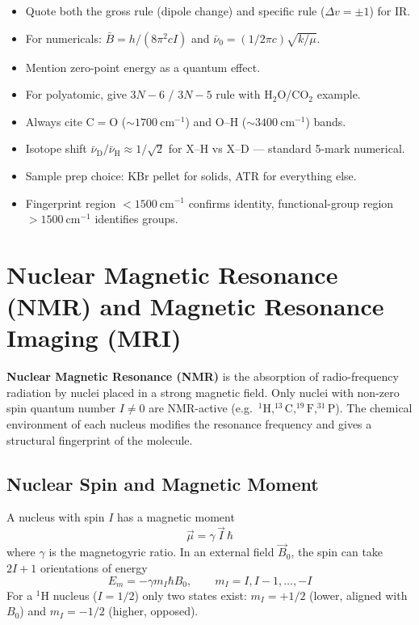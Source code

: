 \documentclass[12pt,a4paper]{article}
\begin{document}
\begin{tcolorbox}[exambox, title={Exam Points (Section 4)}]
\begin{itemize}[leftmargin=*, itemsep=2pt, topsep=2pt]
  \item Quote both the gross rule (dipole change) and specific rule ($\Delta v=\pm1$) for IR.
  \item For numericals: $\bar{B}=h/(8\pi^{2}cI)$ and $\bar{\nu}_0=(1/2\pi c)\sqrt{k/\mu}$.
  \item Mention zero-point energy as a quantum effect.
  \item For polyatomic, give $3N-6$ / $3N-5$ rule with $\mathrm{H_2O}$/$\mathrm{CO_2}$ example.
  \item Always cite C${=}$O ($\sim 1700\ \mathrm{cm^{-1}}$) and O--H ($\sim 3400\ \mathrm{cm^{-1}}$) bands.
  \item Isotope shift $\bar{\nu}_{\mathrm{D}}/\bar{\nu}_{\mathrm{H}} \approx 1/\sqrt{2}$ for X--H vs X--D — standard 5-mark numerical.
  \item Sample prep choice: KBr pellet for solids, ATR for everything else.
  \item Fingerprint region $<1500\ \mathrm{cm^{-1}}$ confirms identity, functional-group region $>1500\ \mathrm{cm^{-1}}$ identifies groups.
\end{itemize}
\end{tcolorbox}

\section{Nuclear Magnetic Resonance (NMR) and Magnetic Resonance Imaging (MRI)}

\begin{tcolorbox}[defbox]
\textbf{Nuclear Magnetic Resonance (NMR)} is the absorption of radio-frequency radiation by nuclei placed in a strong magnetic field. Only nuclei with non-zero spin quantum number $I\neq 0$ are NMR-active (e.g.\ $^{1}\mathrm{H}, ^{13}\mathrm{C}, ^{19}\mathrm{F}, ^{31}\mathrm{P}$). The chemical environment of each nucleus modifies the resonance frequency and gives a structural fingerprint of the molecule.
\end{tcolorbox}

\subsection{Nuclear Spin and Magnetic Moment}
A nucleus with spin $I$ has a magnetic moment
\[
\vec{\mu}=\gamma\,\vec{I}\,\hbar
\]
where $\gamma$ is the magnetogyric ratio. In an external field $\vec{B}_0$, the spin can take $2I+1$ orientations of energy
\[
E_m=-\gamma m_I\hbar B_0,\qquad m_I=I, I-1,\ldots,-I
\]
For a $^{1}\mathrm{H}$ nucleus ($I=1/2$) only two states exist: $m_I=+1/2$ (lower, aligned with $B_0$) and $m_I=-1/2$ (higher, opposed).
\end{document}
